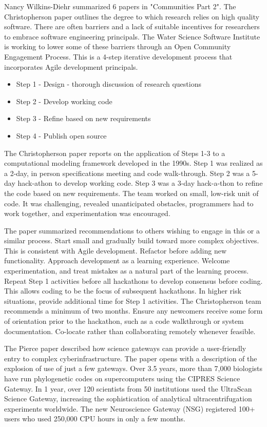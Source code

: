 \documentclass[11pt, oneside]{amsart}
\begin{document}
Nancy Wilkins-Diehr summarized 6 papers in "Communities Part 2". The Christopherson paper outlines the degree to which research
relies on high quality software. There are often barriers and a lack of suitable incentives for researchers to embrace software engineering principals.
The Water Science Software Institute is working to lower some of these barriers through an Open Community Engagement Process.
This is a 4-step iterative development process that incorporates Agile development principals.

\begin{itemize}

\item Step 1 - Design - thorough discussion of research questions
\item Step 2 - Develop working code
\item Step 3 - Refine based on new requirements
\item Step 4 - Publish open source

\end{itemize}

The Christopherson paper reports on the application of Steps 1-3 to a computational modeling framework developed in the 1990s.
Step 1 was realized as a 2-day, in person specifications meeting and code walk-through. Step 2 was a 5-day hack-athon to develop working code.
Step 3 was a 3-day hack-a-thon to refine the code based on new requirements. The team worked on small, low-risk unit of 
code. It was challenging, revealed unanticipated obstacles, programmers had to work together, and experimentation was encouraged.

The paper summarized recommendations to others wishing to engage in this or a similar process. Start small and gradually 
build toward more complex objectives. This is consistent with Agile development. Refactor before adding new functionality.
Approach development as a learning experience. Welcome experimentation, and treat mistakes as a natural part of the learning process.
Repeat Step 1 activities before all hackathons to develop consensus before coding. This allows coding to be the focus of subsequent hackathons. 
In higher risk situations, provide additional time for Step 1 activities. The Christopherson team recommends a minimum of two months.
Ensure any newcomers receive some form of orientation prior to the hackathon, such as a code walkthrough or system documentation.
Co-locate rather than collaborating remotely whenever feasible.

The Pierce paper described how science gateways can provide a user-friendly entry to complex cyberinfrastructure. The paper opens with a description of the explosion of use of just a few gateways. 
Over 3.5 years, more than 7,000 biologists have run phylogenetic codes on supercomputers using the CIPRES Science Gateway. In 1 year, over 120 scientists from 50 institutions used the UltraScan Science Gateway, 
increasing the sophistication of analytical ultracentrifugation experiments worldwide. The new Neuroscience Gateway (NSG) registered 100+ 
users who used 250,000 CPU hours in only a few months.
\end{document}
